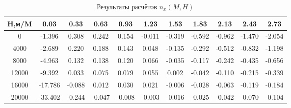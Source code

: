 \begin{table}[H]
\centering
\caption{Результаты расчётов $n_x(M,H)$}
\label{nx}
\begin{tabular}{|c|c|c|c|c|c|c|c|c|c|c|}
\toprule
H,м/M &    0.03 &   0.33 &   0.63 &   0.93 &   1.23 &   1.53 &   1.83 &   2.13 &   2.43 &   2.73 \\
\midrule
0     &  -1.396 &  0.308 &  0.242 &  0.154 & -0.011 & -0.319 & -0.592 & -0.962 & -1.470 & -2.054 \\
4000  &  -2.689 &  0.220 &  0.188 &  0.143 &  0.048 & -0.135 & -0.292 & -0.512 & -0.832 & -1.198 \\
8000  &  -4.963 &  0.132 &  0.138 &  0.120 &  0.066 & -0.035 & -0.117 & -0.242 & -0.435 & -0.656 \\
12000 &  -9.392 &  0.033 &  0.075 &  0.079 &  0.055 &  0.002 & -0.042 & -0.110 & -0.215 & -0.339 \\
16000 & -17.786 & -0.088 &  0.012 &  0.030 &  0.021 & -0.006 & -0.028 & -0.063 & -0.119 & -0.184 \\
20000 & -33.402 & -0.244 & -0.047 & -0.008 & -0.003 & -0.016 & -0.025 & -0.042 & -0.070 & -0.104 \\
\bottomrule
\end{tabular}
\end{table}
